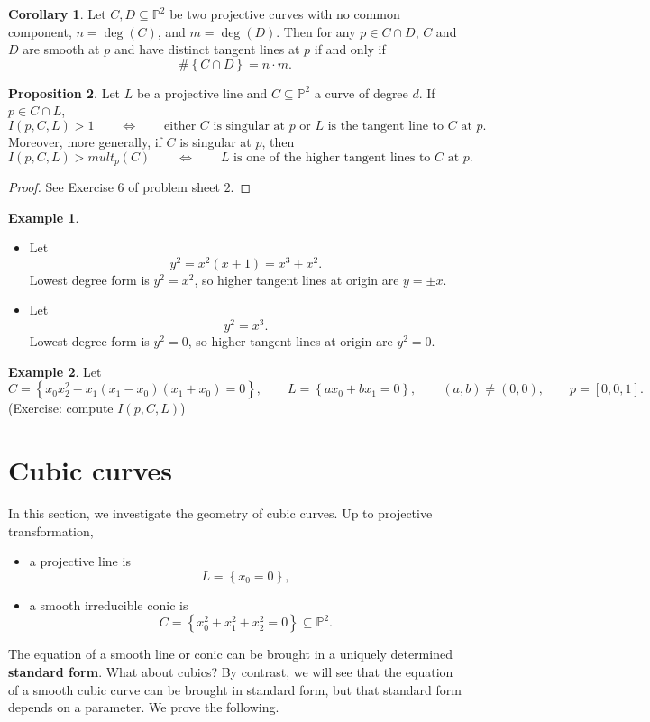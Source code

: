 \documentclass{article}
\renewcommand{\P}{\mathbb{P}}
\newcommand{\rb}[1]{\left( #1 \right)}
\renewcommand{\sb}[1]{\left[ #1 \right]}
\newcommand{\cb}[1]{\left\{ #1 \right\}}
\theoremstyle{definition}\newtheorem{definition}{Definition}[section]
\theoremstyle{definition}\newtheorem{notation}[definition]{Notation}
\theoremstyle{definition}\newtheorem{remark}[definition]{Remark}
\theoremstyle{definition}\newtheorem{example1}[definition]{Example}
\theoremstyle{definition}\newtheorem{fact}{Fact}
\theoremstyle{definition}\newtheorem{exercise}{Exercise}
\theoremstyle{definition}\newtheorem*{example2}{Example}
\newtheorem{proposition}[definition]{Proposition}
\newtheorem{corollary}[definition]{Corollary}
\begin{document}
\begin{corollary}
Let $ C, D \subseteq \P^2 $ be two projective curves with no common component, $ n = \deg\rb{C} $, and $ m = \deg\rb{D} $. Then for any $ p \in C \cap D $, $ C $ and $ D $ are smooth at $ p $ and have distinct tangent lines at $ p $ if and only if
$$ \#\cb{C \cap D} = n \cdot m. $$
\end{corollary}

\begin{proposition}
\label{prop:12.14}
Let $ L $ be a projective line and $ C \subseteq \P^2 $ a curve of degree $ d $. If $ p \in C \cap L $,
$$ I\rb{p, C, L} > 1 \qquad \iff \qquad \text{either } C \text{ is singular at } p \text{ or } L \text{ is the tangent line to } C \text{ at } p. $$
Moreover, more generally, if $ C $ is singular at $ p $, then
$$ I\rb{p, C, L} > mult_p\rb{C} \qquad \iff \qquad L \text{ is one of the higher tangent lines to } C \text{ at } p. $$
\end{proposition}

\begin{proof}
See Exercise $ 6 $ of problem sheet $ 2 $.
\end{proof}

\begin{example2}
\hfill
\begin{itemize}
\item Let
$$ y^2 = x^2\rb{x + 1} = x^3 + x^2. $$
Lowest degree form is $ y^2 = x^2 $, so higher tangent lines at origin are $ y = \pm x $.
\item Let
$$ y^2 = x^3. $$
Lowest degree form is $ y^2 = 0 $, so higher tangent lines at origin are $ y^2 = 0 $.
\end{itemize}
\end{example2}

\begin{example2}
Let
$$ C = \cb{x_0x_2^2 - x_1\rb{x_1 - x_0}\rb{x_1 + x_0} = 0}, \qquad L = \cb{ax_0 + bx_1 = 0}, \qquad \rb{a, b} \ne \rb{0, 0}, \qquad p = \sb{0, 0, 1}. $$
(Exercise: compute $ I\rb{p, C, L} $)
\end{example2}

\pagebreak

\section{Cubic curves}

In this section, we investigate the geometry of cubic curves. Up to projective transformation,
\begin{itemize}
\item a projective line is
$$ L = \cb{x_0 = 0}, $$
\item a smooth irreducible conic is
$$ C = \cb{x_0^2 + x_1^2 + x_2^2 = 0} \subseteq \P^2. $$
\end{itemize}
The equation of a smooth line or conic can be brought in a uniquely determined \textbf{standard form}. What about cubics? By contrast, we will see that the equation of a smooth cubic curve can be brought in standard form, but that standard form depends on a parameter. We prove the following.
\end{document}
